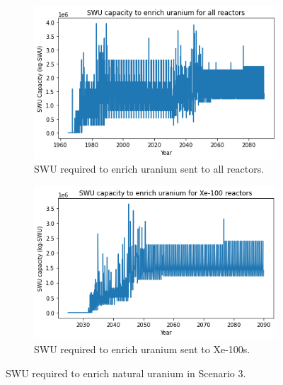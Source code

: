 \documentclass[preprint]{elsarticle}
\providecommand{\DIFaddbeginFL}{} %
\providecommand{\DIFaddendFL}{} %
\providecommand{\DIFdelbeginFL}{} %
\providecommand{\DIFdelendFL}{} %
\begin{document}
\begin{figure}
    \centering
    \DIFdelbeginFL %
\DIFdelendFL \DIFaddbeginFL \begin{subfigure}{0.45\textwidth}
        \DIFaddendFL \centering
        \DIFdelbeginFL %
\DIFdelendFL \DIFaddbeginFL \includegraphics[scale=0.4]{../figures/totalswu_scenarios_3.png}
        \DIFaddendFL \caption{\gls{SWU} required to enrich uranium sent to all reactors.}
        \label{fig:totalswu_3}
    \end{subfigure}
    \hspace{0.8cm}
    \DIFdelbeginFL %
\DIFdelendFL \DIFaddbeginFL \begin{subfigure}{0.45\textwidth}
        \DIFaddendFL \centering
        \DIFdelbeginFL %
\DIFdelendFL \DIFaddbeginFL \includegraphics[scale=0.4]{../figures/haleuSWU_scenarios_3.png}
        \DIFaddendFL \caption{\gls{SWU} required to enrich uranium sent to Xe-100s.}
        \label{fig:haleuswu_3}
    \end{subfigure}
    \caption{\gls{SWU} required to enrich natural uranium in Scenario 3.}
    \label{fig:swu_3}
\end{figure}
\end{document}
